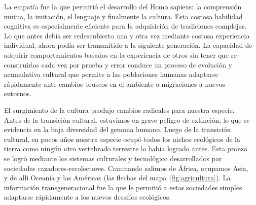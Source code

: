 \documentclass[a4paper,10pt]{book}
\theoremstyle{definition}
\begin{document}

La empatía fue la que permitió el desarrollo del Homo sapiens: la comprensión mutua, la imitación, el lenguaje y finalmente la cultura.
Esta costosa habilidad cognitiva es especialmente eficiente para la adquisición de tradiciones complejas.
Lo que antes debía ser redescubierto una y otra vez mediante costosa experiencia individual, ahora podía ser transmitido a la siguiente generación.
La capacidad de adquirir comportamientos basados en la experiencia de otros sin tener que re-construirlos cada vez por prueba y error conduce un proceso de evolución y acumulativa cultural que permite a las poblaciones humanas adaptarse rápidamente ante cambios bruscos en el ambiente o migraciones a nuevos entornos.


El surgimiento de la cultura produjo cambios radicales para nuestra especie.
Antes de la transición cultural, estuvimos en grave peligro de extinción, lo que se evidencia en la baja diversidad del genoma humano.
Luego de la transición cultural, en pocos años nuestra especie ocupó todos los nichos ecológicos de la tierra como ningún otro vertebrado terrestre lo había logrado antes.
Esta proeza se logró mediante los sistemas culturales y tecnológico desarrollados por sociedades cazadores-recolectores.
Caminando salimos de África, ocupamos Asia, y de allí Oceanía y las Américas (las flechas del mapa~\ref{fig:agricultura}).
La información transgeneracional fue la que le permitió a estas sociedades simples adaptarse rápidamente a los nuevos desafíos ecológicos.

\end{document}
